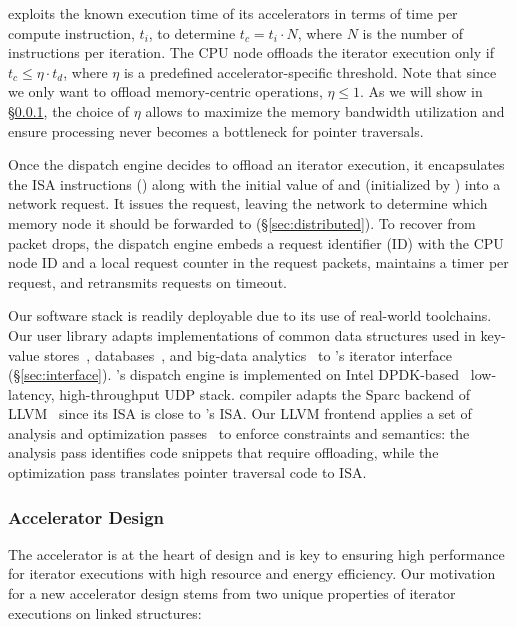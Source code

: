 \name exploits the known execution time of its accelerators in terms of time per compute instruction, $t_i$, to determine $t_c = t_i \cdot N$, where $N$ is the number of instructions per iteration. The CPU node offloads the iterator execution only if $t_c \leq \eta \cdot t_d$, where $\eta$ is a predefined accelerator-specific threshold. Note that since we only want to offload memory-centric operations, $\eta \leq 1$. As we will show in \S\ref{ssec:architecture}, the choice of $\eta$ allows \name to maximize the memory bandwidth utilization and ensure processing never becomes a bottleneck for pointer traversals.


 Once the dispatch engine decides to offload an iterator execution, it encapsulates the ISA instructions () along with the initial value of  and  (initialized by ) into a network request. It issues the request, leaving the network to determine which memory node it should be forwarded to (\S\ref{sec:distributed}). To recover from packet drops, the dispatch engine embeds a request identifier (ID) with the CPU node ID and a local request counter in the request packets, maintains a timer per request, and retransmits requests on timeout.

 Our software stack is readily deployable due to its use of real-world toolchains. Our user library adapts implementations of common data structures used in key-value stores~\cite{redis, memcached}, databases~\cite{wiredtiger, btree1, btree2, trie1, trie3}, and big-data analytics~\cite{powergraph, graphx, graphchi, pagerank} to \name's iterator interface (\S\ref{sec:interface}). \name's dispatch engine is implemented on Intel DPDK-based~\cite{dpdk} low-latency, high-throughput UDP stack. \name compiler adapts the Sparc backend of LLVM~\cite{llvmsparc} since its ISA is close to \name's ISA. Our LLVM frontend applies a set of analysis and optimization passes~\cite{llvmpass} to enforce \name constraints and semantics: the analysis pass identifies code snippets that require offloading, while the optimization pass translates pointer traversal code to \name ISA.


\subsubsection{\name Accelerator Design}
\label{ssec:architecture}
\label{ssec:traversalexample}
The accelerator is at the heart of \name design and is key to ensuring high performance for iterator executions with high resource and energy efficiency. Our motivation for a new accelerator design stems from two unique properties of iterator executions on linked structures: 



